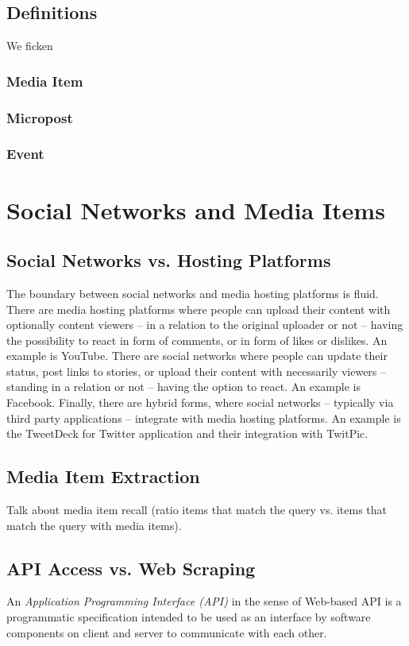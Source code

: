 \documentclass{acm_proc_article-sp}
\let\oldemph\emph
\renewcommand{\emph}[1]{\oldemph{\fontsize{9}{9}\selectfont #1}}
\begin{document}
\subsection{Definitions}
We ficken

\subsubsection{Media Item}


\subsubsection{Micropost}

\subsubsection{Event}

\section{Social Networks and Media Items}

\subsection{Social Networks vs. Hosting Platforms}
The boundary between social networks and media hosting platforms is fluid.
There are media hosting platforms where people can upload their content with optionally content viewers -- in a relation to the original uploader or not -- having the possibility to react in form of comments, or in form of likes or dislikes.
An example is YouTube.
There are social networks where people can update their status, post links to stories, or upload their content with necessarily viewers -- standing in a relation or not -- having the option to react.
An example is Facebook.
Finally, there are hybrid forms, where social networks -- typically via third party applications -- integrate with media hosting platforms.
An example is the TweetDeck for Twitter application and their integration with TwitPic.

\subsection{Media Item Extraction}
Talk about media item recall (ratio items that match the query vs. items that match the query with media items).

\subsection{API Access vs. Web Scraping}
An \emph{Application Programming Interface (API)} in the sense of Web-based API is a programmatic specification intended to be used as an interface by software components on client and server to communicate with each other.
\end{document}
